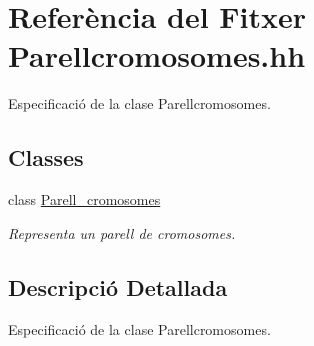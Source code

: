 \hypertarget{_parellcromosomes_8hh}{}\section{Referència del Fitxer Parellcromosomes.\+hh}
\label{_parellcromosomes_8hh}


Especificació de la clase Parellcromosomes.  


\subsection*{Classes}
\begin{DoxyCompactItemize}
\item 
class \hyperlink{class_parell__cromosomes}{Parell\+\_\+cromosomes}
\begin{DoxyCompactList}\small\item\em Representa un parell de cromosomes. \end{DoxyCompactList}\end{DoxyCompactItemize}


\subsection{Descripció Detallada}
Especificació de la clase Parellcromosomes. 

